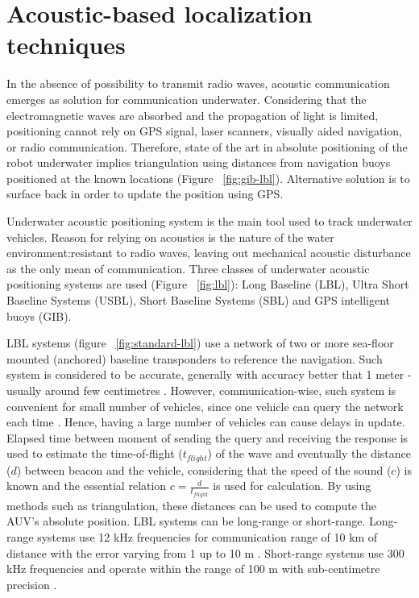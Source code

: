 \section{Acoustic-based localization techniques} \label{sec:acoustic}
In the absence of possibility to transmit radio waves, acoustic communication emerges as solution for communication underwater. Considering that the electromagnetic waves are absorbed and the propagation of light is limited, positioning cannot rely on GPS signal, laser scanners, visually aided navigation, or radio communication. Therefore, state of the art in absolute positioning of the robot underwater implies triangulation using distances from navigation buoys positioned at the known locations (Figure ~\ref{fig:gib-lbl}). Alternative solution is to surface back in order to update the position using GPS. 
 
Underwater acoustic positioning system is the main tool used to track underwater vehicles. Reason for relying on acoustics is the nature of the water environment:resistant to radio waves, leaving out mechanical acoustic disturbance as the only mean of communication. Three classes of underwater acoustic positioning systems are used (Figure ~\ref{fig:lbl}): Long Baseline (LBL), Ultra Short Baseline Systems (USBL), Short Baseline Systems (SBL) and GPS intelligent buoys (GIB). 

LBL systems (figure ~\ref{fig:standard-lbl}) use a network of two or more sea-floor mounted (anchored) baseline transponders to reference the navigation. Such system is considered to be accurate, generally with accuracy better that 1 meter - usually around few centimetres \cite{noaa01}. However, communication-wise, such system is convenient for small number of vehicles, since one vehicle can query the network each time \cite{bahr08}. Hence, having a large number of vehicles can cause delays in update. Elapsed time between moment of sending the query and receiving the response is used to estimate the time-of-flight ($t_{flight}$) of the wave and eventually the distance ($d$) between beacon and the vehicle, considering that the speed of the sound ($c$) is known and the essential relation $c = \frac{d}{t_{flight}}$ is used for calculation. By using methods such as triangulation, these distances can be used to compute the AUV's absolute position. LBL systems can be long-range or short-range. Long-range systems use 12 kHz frequencies for communication range of 10 km of distance with the error varying from 1 up to 10 m \cite{whitcomb99combined, bahr08}. Short-range systems use 300 kHz frequencies and operate within the range of 100 m with sub-centimetre precision \cite{whitcomb99combined, bahr08}. 
 
